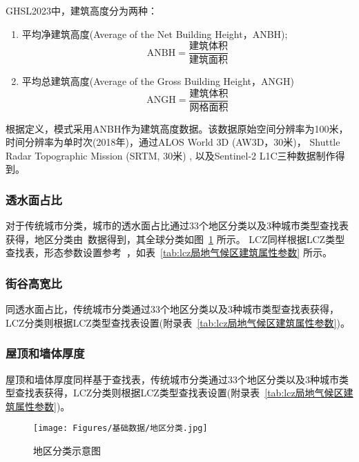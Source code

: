 GHSL2023中，建筑高度分为两种：
\begin{enumerate}
  \item 平均净建筑高度(Average of the Net Building Height，ANBH);
    \begin{equation}\label{ANBH}
      \mathrm{ANBH}=\frac{\mbox{建筑体积}}{\mbox{建筑面积}}
    \end{equation}
  \item 平均总建筑高度(Average of the Gross Building Height，ANGH)
    \begin{equation}
      \mathrm{ANGH}=\frac{\mbox{建筑体积}}{\mbox{网格面积}}
    \end{equation}
\end{enumerate}
根据定义，模式采用ANBH作为建筑高度数据。该数据原始空间分辨率为100米，时间分辨率为单时次(2018年)，通过ALOS World 3D (AW3D，30米)， Shuttle Radar Topographic Mission (SRTM, 30米) , 以及Sentinel-2 L1C三种数据制作得到。
%

\subsubsection{透水面占比}\label{透水面占比}
对于传统城市分类，城市的透水面占比通过33个地区分类以及3种城市类型查找表获得，地区分类由~\citet{oleson2020parameterization}数据得到，其全球分类如图~\ref{fig:地区分类} 所示。
LCZ同样根据LCZ类型查找表，形态参数设置参考~\citet{stewart2014evaluation}，如表~\ref{tab:lcz局地气候区建筑属性参数} 所示。

\subsubsection{街谷高宽比}\label{街谷高宽比}
同透水面占比，传统城市分类通过33个地区分类以及3种城市类型查找表获得，LCZ分类则根据LCZ类型查找表设置(附录表~\ref{tab:lcz局地气候区建筑属性参数})。

\subsubsection{屋顶和墙体厚度}\label{屋顶和墙体厚度}
屋顶和墙体厚度同样基于查找表，传统城市分类通过33个地区分类以及3种城市类型查找表获得，LCZ分类则根据LCZ类型查找表设置(附录表~\ref{tab:lcz局地气候区建筑属性参数})。

{
  \begin{figure}[htbp]
    \centering
    \texttt{[image: Figures/基础数据/地区分类.jpg]}
    \caption{地区分类示意图}
    \label{fig:地区分类}
  \end{figure}
}

